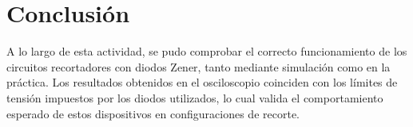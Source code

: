 \section{Conclusión}

A lo largo de esta actividad, se pudo comprobar el correcto funcionamiento de los circuitos recortadores con diodos Zener, tanto mediante
simulación como en la práctica. Los resultados obtenidos en el osciloscopio coinciden con los límites de tensión impuestos por los diodos
utilizados, lo cual valida el comportamiento esperado de estos dispositivos en configuraciones de recorte.
